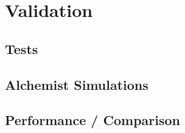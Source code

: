 
\chapter{Validation}
\label{ch:validation}

\section{Tests}

\section{Alchemist Simulations}
\label{sec:alchemist-simulations}
\section{Performance / Comparison}
\label{sec:performance-/-comparison}



%
%
%

